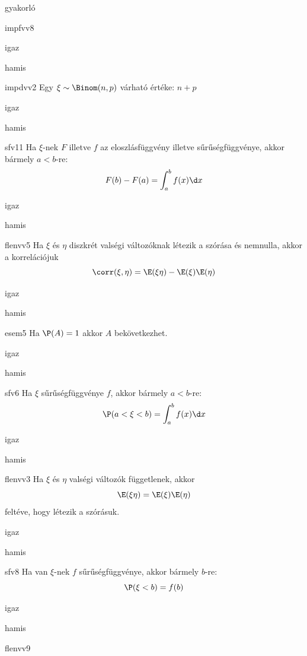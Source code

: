 \documentclass[12pt]{article}
\begin{document}
\begin{quiz}{gyakorló}
\begin{multi}[feedback={Def.}]{impfvv8}
\item* igaz
\item hamis
\end{multi}
\begin{multi}[feedback={$\xi=\xi_1+\ldots+\xi_n$, ahol $\xi_k$ Bernoulli és $\E(\xi_k)=p$+$\E$-additívitása}]{impdvv2}
Egy $\xi\sim \Binom(n,p)$ várható értéke: $n+p$
\item igaz
\item* hamis
\end{multi}
\begin{multi}[feedback={Def.}]{sfv11}
Ha $\xi$-nek $F$ illetve $f$ az eloszlásfüggvény illetve sűrűségfüggvénye, akkor bármely $a<b$-re:
$$
F(b)-F(a)=\int_{a}^{b}f(x)\d x
$$
\item* igaz
\item hamis
\end{multi}
\begin{multi}[feedback={Def.}]{flenvv5}
Ha $\xi$ és $\eta$ diszkrét valségi változóknak létezik a szórása és nemnulla, akkor a 
korrelációjuk
$$
\corr(\xi,\eta)=\E(\xi\eta)-\E(\xi)\E(\eta)
$$
\item igaz
\item* hamis
\end{multi}
\begin{multi}[feedback={Nókoment.}]{esem5}
Ha $\P(A)=1$ akkor $A$ bekövetkezhet.
\item* igaz
\item hamis
\end{multi}
\begin{multi}[feedback={Def.}]{sfv6}
Ha $\xi$ sűrűségfüggvénye $f$, akkor bármely $a<b$-re:
$$
\P(a<\xi<b)=\int_{a}^{b}f(x)\d x
$$
\item* igaz
\item hamis
\end{multi}
\begin{multi}[feedback={Tétel.}]{flenvv3}
Ha $\xi$ és $\eta$ valségi változók függetlenek, akkor
$$
\E(\xi \eta)=\E(\xi)\E(\eta)
$$
feltéve, hogy létezik a szórásuk.
\item* igaz
\item hamis
\end{multi}
\begin{multi}[feedback={Def.}]{sfv8}
Ha van $\xi$-nek $f$ sűrűségfüggvénye, akkor bármely $b$-re:
$$
\P(\xi<b)=f(b)
$$
\item igaz
\item* hamis
\end{multi}
\begin{multi}[feedback={Tulajdonság,tétel.}]{flenvv9}

\end{multi}
\end{quiz}
\end{document}
